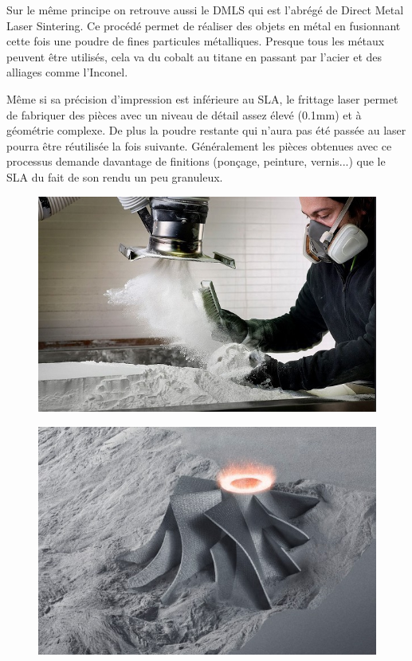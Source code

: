 \documentclass{article}
\begin{document}
Sur le même principe on retrouve aussi le DMLS qui est l'abrégé de Direct Metal Laser Sintering. Ce procédé permet de réaliser des objets en métal en fusionnant cette fois une poudre de fines particules métalliques. Presque tous les métaux peuvent être utilisés, cela va du cobalt au titane en passant par l'acier et des alliages comme l'Inconel.\hfill

Même si sa précision d'impression est inférieure au SLA, le frittage laser permet de fabriquer des pièces avec un niveau de détail assez élevé (0.1mm) et à géométrie complexe. De plus la poudre restante qui n'aura pas été passée au laser pourra être réutilisée la fois suivante. Généralement les pièces obtenues avec ce processus demande davantage de finitions (ponçage, peinture, vernis...) que le SLA du fait de son rendu un peu granuleux.

\begin{figure}[h!]
\centering
\includegraphics[scale=0.4]{./images/procede-sls.png}
\end{figure}

\begin{figure}[h!]
\centering
\includegraphics[scale=0.4]{./images/slm.png}
\end{figure}
\end{document}
